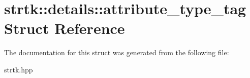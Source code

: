 \hypertarget{structstrtk_1_1details_1_1attribute__type__tag}{\section{strtk\-:\-:details\-:\-:attribute\-\_\-type\-\_\-tag Struct Reference}
\label{structstrtk_1_1details_1_1attribute__type__tag}
}


The documentation for this struct was generated from the following file\-:\begin{DoxyCompactItemize}
\item 
strtk.\-hpp\end{DoxyCompactItemize}
